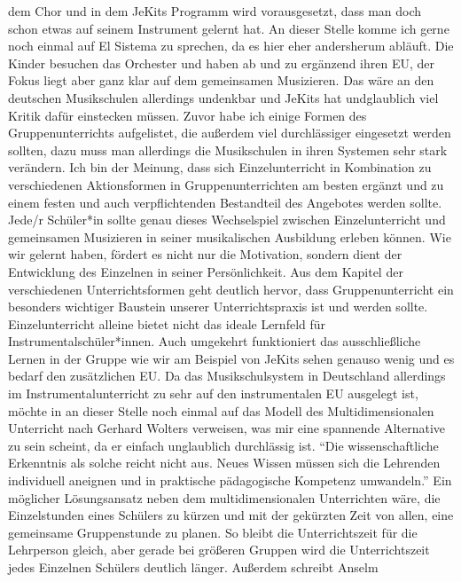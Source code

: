 dem Chor und in dem JeKits Programm wird vorausgesetzt, dass man doch schon
etwas auf seinem Instrument gelernt hat. An dieser Stelle komme ich gerne noch
einmal auf El Sistema zu sprechen, da es hier eher andersherum abläuft. Die
Kinder besuchen das Orchester und haben ab und zu ergänzend ihren EU, der Fokus
liegt aber ganz klar auf dem gemeinsamen Musizieren. Das wäre an den deutschen
Musikschulen allerdings undenkbar und JeKits hat undglaublich viel Kritik dafür
einstecken müssen.
Zuvor habe ich einige Formen des Gruppenunterrichts aufgelistet,
die außerdem viel durchlässiger eingesetzt werden sollten, dazu muss man allerdings die
Musikschulen in ihren Systemen sehr stark verändern. Ich bin der Meinung, dass
sich Einzelunterricht in Kombination zu verschiedenen Aktionsformen in
Gruppenunterrichten am besten ergänzt und zu einem festen und auch
verpflichtenden Bestandteil des Angebotes werden sollte. Jede/r Schüler*in
sollte genau dieses Wechselspiel zwischen Einzelunterricht und gemeinsamen
Musizieren in seiner musikalischen Ausbildung erleben können. Wie wir gelernt
haben, fördert es nicht nur die Motivation, sondern dient der Entwicklung des
Einzelnen in seiner Persönlichkeit. Aus dem Kapitel der verschiedenen
Unterrichtsformen geht deutlich hervor, dass Gruppenunterricht ein besonders
wichtiger Baustein unserer Unterrichtspraxis ist und werden sollte.
Einzelunterricht alleine bietet nicht das ideale Lernfeld für
Instrumentalschüler*innen. Auch umgekehrt funktioniert das ausschließliche Lernen in
der Gruppe wie wir am Beispiel von JeKits sehen genauso wenig und es bedarf den
zusätzlichen EU. Da das Musikschulsystem in Deutschland allerdings im
Instrumentalunterricht zu sehr auf den instrumentalen EU ausgelegt ist, möchte
in an dieser Stelle noch einmal auf das Modell des Multidimensionalen Unterricht
nach Gerhard Wolters verweisen, was mir eine spannende Alternative zu sein
scheint, da er einfach unglaublich durchlässig ist.
\enquote{Die wissenschaftliche Erkenntnis als solche reicht nicht aus. Neues
Wissen müssen sich die Lehrenden individuell aneignen und in praktische
pädagogische Kompetenz umwandeln.}
\autocite[10]{losert:die_kunst_zu_unterrichten} Ein möglicher Lösungsansatz
neben dem multidimensionalen Unterrichten wäre, die Einzelstunden eines Schülers
zu kürzen und mit der gekürzten Zeit von allen, eine gemeinsame Gruppenstunde zu
planen. So bleibt die Unterrichtszeit für die Lehrperson gleich, aber gerade bei
größeren Gruppen wird die Unterrichtszeit jedes Einzelnen Schülers deutlich
länger.\autocite[33]{losert:die_kunst_zu_unterrichten} Außerdem schreibt Anselm
